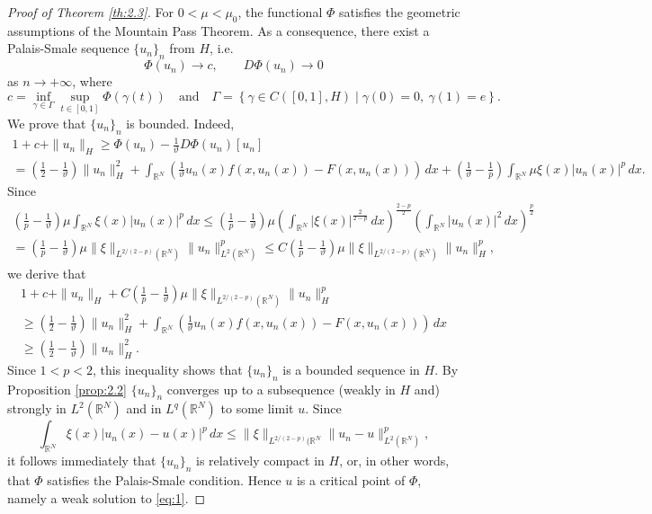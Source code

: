 \documentclass[11pt]{amsart}
\numberwithin{equation}{section}
\theoremstyle{remark}
\theoremstyle{definition}
\begin{document}
%
\begin{proof}[Proof of Theorem \ref{th:2.3}]
	For $0<\mu < \mu_0$, the functional $\Phi$ satisfies the geometric assumptions of the Mountain Pass Theorem. As a consequence, there exist a Palais-Smale sequence $\{u_n\}_n$ from $H$, i.e.
	\begin{equation*}
		\Phi(u_n) \to c, \qquad D\Phi(u_n) \to 0
	\end{equation*}
as $n \to +\infty$, where 
\[
c = \inf_{\gamma \in \Gamma} \sup_{t \in [0,1]} \Phi(\gamma(t)) \quad\text{and} \quad
\Gamma = \left\{ \gamma \in C([0,1],H) \mid \gamma(0)=0, \ \gamma(1)=e 
\right\}.
\]
We prove that $\{u_n\}_n$ is bounded. Indeed,
\begin{multline*}
1+c+\|u_n\|_H \geqslant \Phi(u_n) - \frac{1}{\vartheta} D \Phi (u_n)[u_n] \\
 = \left( \frac{1}{2} - \frac{1}{\vartheta} \right) \|u_n\|_H^2 + \int_{\mathbb{R}^N} \left( \frac{1}{\vartheta} u_n(x) f(x,u_n(x))-F(x,u_n(x)) \right) \, dx + \left( \frac{1}{\vartheta}-\frac{1}{p} \right) \int_{\mathbb{R}^N} \mu \xi(x) |u_n(x)|^p \, dx.
\end{multline*}
Since
\begin{multline*}
\left( \frac{1}{p}-\frac{1}{\vartheta} \right) \mu \int_{\mathbb{R}^N} \xi(x) |u_n(x)|^p \, dx \leqslant \left( \frac{1}{p}-\frac{1}{\vartheta} \right) \mu \left( \int_{\mathbb{R}^N} |\xi(x)|^{\frac{2}{2-p}} \, dx \right)^{\frac{2-p}{2}} \left( \int_{\mathbb{R}^N} |u_n(x)|^2 \, dx
\right)^{\frac{p}{2}} \\
= \left( \frac{1}{p}-\frac{1}{\vartheta} \right) \mu \|\xi\|_{L^{2/(2-p)}(\mathbb{R}^N)} \|u_n\|_{L^2(\mathbb{R}^N)}^p \leqslant C \left( \frac{1}{p}-\frac{1}{\vartheta} \right) \mu  \|\xi\|_{L^{2/(2-p)}(\mathbb{R}^N)} \|u_n\|_H^p,
\end{multline*}
we derive that
\begin{multline*}
1+c+\|u_n\|_H +C \left( \frac{1}{p}-\frac{1}{\vartheta} \right) \mu  \|\xi\|_{L^{2/(2-p)}(\mathbb{R}^N)} \|u_n\|_H^p \\
\geqslant \left( \frac{1}{2} - \frac{1}{\vartheta} \right) \|u_n\|_H^2 + \int_{\mathbb{R}^N} \left( \frac{1}{\vartheta} u_n(x) f(x,u_n(x))-F(x,u_n(x)) \right) \, dx \\
\geqslant \left( \frac{1}{2} - \frac{1}{\vartheta} \right) \|u_n\|_H^2.
\end{multline*}
Since $1<p<2$, this inequality shows that $\{u_n\}_n$ is a bounded sequence in $H$. By Proposition \ref{prop:2.2} $\{u_n\}_n$ converges up to a subsequence (weakly in $H$ and) strongly in $L^2(\mathbb{R}^N)$ and in $L^q(\mathbb{R}^N)$ to some limit $u$. Since
\[
\int_{\mathbb{R}^N} \xi(x) |u_n(x)-u(x)|^p \, dx \leqslant \|\xi\|_{L^{2/(2-p)}(\mathbb{R}^N} \|u_n-u\|_{L^2(\mathbb{R}^N)}^p,
\]
it follows immediately that $\{u_n\}_n$ is relatively compact in $H$, or, in other words, that $\Phi$ satisfies the Palais-Smale condition. Hence $u$ is a critical point of $\Phi$, namely a weak solution to \eqref{eq:1}.
\end{proof}	
\end{document}
